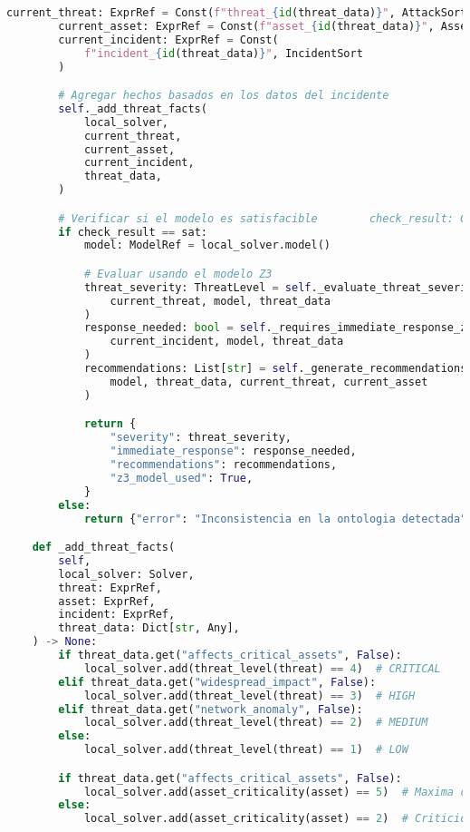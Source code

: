 \begin{lstlisting}[language=python, inputencoding=utf8]
        current_threat: ExprRef = Const(f"threat_{id(threat_data)}", AttackSort)
        current_asset: ExprRef = Const(f"asset_{id(threat_data)}", AssetSort)
        current_incident: ExprRef = Const(
            f"incident_{id(threat_data)}", IncidentSort
        )

        # Agregar hechos basados en los datos del incidente
        self._add_threat_facts(
            local_solver,
            current_threat,
            current_asset,
            current_incident,
            threat_data,
        )

        # Verificar si el modelo es satisfacible        check_result: CheckSatResult = local_solver.check()
        if check_result == sat:
            model: ModelRef = local_solver.model()

            # Evaluar usando el modelo Z3
            threat_severity: ThreatLevel = self._evaluate_threat_severity_z3(
                current_threat, model, threat_data
            )
            response_needed: bool = self._requires_immediate_response_z3(
                current_incident, model, threat_data
            )
            recommendations: List[str] = self._generate_recommendations_z3(
                model, threat_data, current_threat, current_asset
            )

            return {
                "severity": threat_severity,
                "immediate_response": response_needed,
                "recommendations": recommendations,
                "z3_model_used": True,
            }
        else:
            return {"error": "Inconsistencia en la ontologia detectada"}

    def _add_threat_facts(
        self,
        local_solver: Solver,
        threat: ExprRef,
        asset: ExprRef,
        incident: ExprRef,
        threat_data: Dict[str, Any],
    ) -> None:
        if threat_data.get("affects_critical_assets", False):
            local_solver.add(threat_level(threat) == 4)  # CRITICAL
        elif threat_data.get("widespread_impact", False):
            local_solver.add(threat_level(threat) == 3)  # HIGH
        elif threat_data.get("network_anomaly", False):
            local_solver.add(threat_level(threat) == 2)  # MEDIUM
        else:
            local_solver.add(threat_level(threat) == 1)  # LOW

        if threat_data.get("affects_critical_assets", False):
            local_solver.add(asset_criticality(asset) == 5)  # Maxima criticidad
        else:
            local_solver.add(asset_criticality(asset) == 2)  # Criticidad normal


\end{lstlisting}
